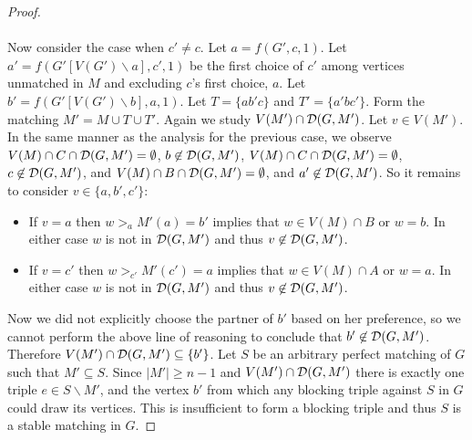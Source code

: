 \begin{proof}
\paragraph{}
Now consider the case when $c' \neq c$. Let $a = f(G',c,1)$. Let $a' = f(G'[V(G')\backslash a], c',1)$ be the first choice of $c'$ among vertices unmatched in $M$ and excluding $c$'s first choice, $a$. Let $b' = f(G'[V(G')\backslash b], a, 1)$. Let $T = \{ab'c\}$ and $T' = \{a'bc'\}$. Form the matching $M' = M \cup T \cup T'$. Again we study $V(M') \cap \mathcal{D}(G,M')$. Let $v \in V(M')$. In the same manner as the analysis for the previous case, we observe $V(M) \cap C \cap \mathcal{D}(G,M') = \emptyset$, $b \not \in \mathcal{D}(G,M')$, $V(M) \cap C \cap \mathcal{D}(G,M') = \emptyset $, $c\not\in \mathcal{D}(G,M')$, and $V(M) \cap B \cap \mathcal{D}(G,M') = \emptyset$, and $a' \not\in \mathcal{D}(G,M')$. So it remains to consider $v \in \{a, b', c'\}$:
\begin{itemize}
\item If $v = a$ then $w>_a M'(a) = b'$ implies that $w \in V(M) \cap B$ or $w = b$. In either case $w$ is not in $\mathcal{D}(G,M')$ and thus $v \not\in \mathcal{D}(G,M')$.
\item If $v = c'$ then $w>_{c'} M'(c') = a$ implies that $w \in V(M) \cap A$ or $w = a$. In either case $w$ is not in $\mathcal{D}(G,M')$ and thus $v \not\in \mathcal{D}(G,M')$.
\end{itemize}
Now we did not explicitly choose the partner of $b'$ based on her preference, so we cannot perform the above line of reasoning to conclude that $b' \not\in \mathcal{D}(G,M')$. Therefore $V(M') \cap \mathcal{D}(G,M') \subseteq \{b'\}$. Let $S$ be an arbitrary perfect matching of $G$ such that $M' \subseteq S$. Since $|M'| \geq n-1$ and $V(M') \cap \mathcal{D}(G,M')$ there is exactly  one triple $e \in S \backslash M'$, and the vertex $b'$ from which any blocking triple against $S$ in $G$ could draw its vertices. This is insufficient to form a blocking triple and thus $S$ is a stable matching in $G$.
\end{proof}

